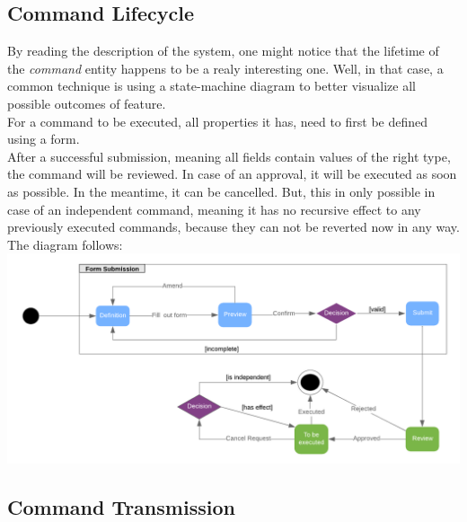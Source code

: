 \documentclass{article}
\begin{document}
\subsection{Command Lifecycle}
By reading the description of the system, one might notice that the lifetime of the \emph{command} entity happens to be a realy interesting one. Well, in that case, a common technique is using a state-machine diagram to better visualize all possible outcomes of feature.\\
For a command to be executed, all properties it has, need to first be defined using a form.\\
After a successful submission, meaning all fields contain values of the right type, the command will be reviewed. In case of an approval, it will be executed as soon as possible. In the meantime, it can be cancelled. But, this in only possible in case of an independent command, meaning it has no recursive effect to any previously executed commands, because they can not be reverted now in any way. The diagram follows:\\
\includegraphics[scale=0.325]{state}  

\subsection{Command Transmission}
\end{document}
